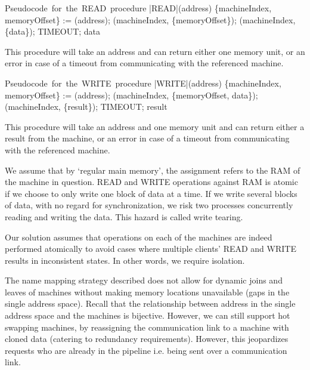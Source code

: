 \documentclass[11pt]{article}
\begin{document}
\begin{program}
\mbox{Pseudocode for the READ procedure}
        \PROC |READ|(address) \BODY
               \{machineIndex, memoryOffset\} :=  (address);
                (machineIndex, \{memoryOffset\});
                \;  (machineIndex, \{data\});
                \; TIMEOUT;
                \; data \ENDPROC
\end{program}

This procedure will take an address and can return either one memory unit, or an error in case of a timeout from communicating with the referenced machine.
    
\begin{program}
\mbox{Pseudocode for the WRITE procedure}
        \PROC |WRITE|(address) \BODY
               \{machineIndex, memoryOffset\} :=  (address);
                (machineIndex, \{memoryOffset, data\});
                \;  (machineIndex, \{result\});
               \; TIMEOUT;
                \; result \ENDPROC
\end{program}


This procedure will take an address and one memory unit and can return either a
result from the machine, or an error in case of a timeout from communicating
with the referenced machine.


We assume that by ‘regular main memory’, the assignment refers to the RAM of
the machine in question. READ and WRITE operations against RAM is atomic if
we choose to only write one block of data at a time. If we write several blocks of data, with no regard for synchronization, we risk two processes concurrently reading and writing the data. This hazard is called write tearing. 

Our solution assumes that operations on each of the machines are indeed performed
atomically to avoid cases where multiple clients' READ and WRITE results in
inconsistent states. In other words, we require isolation.



The name mapping strategy described does not allow for dynamic joins and leaves
of machines without making memory locations unavailable (gaps in the single address
space). Recall that the relationship between address in the single address space
and the machines is bijective.
However, we can still support hot
swapping machines, by reassigning the communication link to a machine with cloned
data (catering to redundancy requirements). However, this jeopardizes requests who
are already in the pipeline i.e. being sent over a communication link.\\
\end{document}

